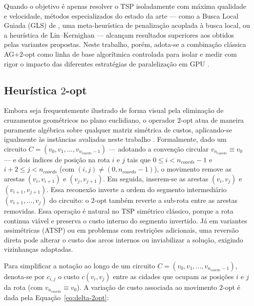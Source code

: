 Quando o objetivo é apenas resolver o TSP isoladamente com máxima qualidade e velocidade, métodos especializados do estado da arte --- como a Busca Local Guiada (GLS) de \textcite{voudouris1999tsp}, uma meta-heurística de penalização acoplada à busca local, ou a heurística de Lin--Kernighan \autocite{lin1973efficient,helsgaun2000effective} --- alcançam resultados superiores aos obtidos pelas variantes propostas.
Neste trabalho, porém, adota-se a combinação clássica AG+\(2\)-opt como linha de base algorítmica controlada para isolar e medir com rigor o impacto das diferentes estratégias de paralelização em GPU \autocite{larranaga1999genetic,fujimoto2011highly}.

\subsection{Heurística \texorpdfstring{\(2\)-opt}{2-opt}}\label{sec-221-2opt}

Embora seja frequentemente ilustrado de forma visual pela eliminação de cruzamentos geométricos no plano euclidiano, o operador \(2\)-opt atua de maneira puramente algébrica sobre qualquer matriz simétrica de custos, aplicando-se igualmente às instâncias avaliadas neste trabalho \autocite{croes1958method}.
Formalmente, dado um circuito \(C = (v_0, v_1, \dots, v_{n_{coords}-1})\) --- adotando a convenção circular \(v_{n_{coords}} \equiv v_0\) --- e dois índices de posição na rota \(i\) e \(j\) tais que \(0 \leq i < n_{coords}-1\) e \(i+2 \leq j < n_{coords}\) (com \((i,j) \neq (0, n_{coords}-1)\)), o movimento remove as arestas \((v_i, v_{i+1})\) e \((v_j, v_{j+1})\).
Em seguida, inserem-se as arestas \((v_i, v_j)\) e \((v_{i+1}, v_{j+1})\).
Essa reconexão inverte a ordem do segmento intermediário \((v_{i+1}, \dots, v_j)\) do circuito: o \(2\)-opt também reverte a sub-rota entre as arestas removidas.
Essa operação é natural no TSP simétrico clássico, porque a rota continua viável e preserva o custo interno do segmento invertido.
Já em variantes assimétricas (ATSP) ou em problemas com restrições adicionais, uma reversão direta pode alterar o custo dos arcos internos ou inviabilizar a solução, exigindo vizinhanças adaptadas.

Para simplificar a notação ao longo de um circuito \(C = (v_0, v_1, \dots, v_{n_{coords}-1})\), denota-se por \(c_{i,j}\) o custo \(c(v_i, v_j)\) entre as cidades que ocupam as posições \(i\) e \(j\) da rota (com \(v_{n_{coords}} \equiv v_0\)).
A variação de custo associada ao movimento \(2\)-opt é dada pela Equação~\eqref{eq:delta-2opt}:


